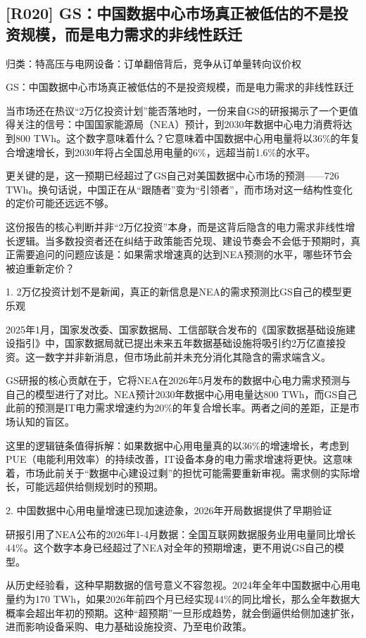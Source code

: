 \documentclass[11pt]{ctexart}
\begin{document}
\subsection{[R020] GS：中国数据中心市场真正被低估的不是投资规模，而是电力需求的非线性跃迁}
{\small\color{refgray}归类：特高压与电网设备：订单翻倍背后，竞争从订单量转向议价权}

GS：中国数据中心市场真正被低估的不是投资规模，而是电力需求的非线性跃迁

当市场还在热议“2万亿投资计划”能否落地时，一份来自GS的研报揭示了一个更值得关注的信号：中国国家能源局（NEA）预计，到2030年数据中心电力消费将达到800 TWh。这个数字意味着什么？它意味着中国数据中心用电量将以36\%的年复合增速增长，到2030年将占全国总用电量的6\%，远超当前1.6\%的水平。

更关键的是，这一预期已经超过了GS自己对美国数据中心市场的预测——726 TWh。换句话说，中国正在从“跟随者”变为“引领者”，而市场对这一结构性变化的定价可能还远远不够。

这份报告的核心判断并非“2万亿投资”本身，而是这背后隐含的电力需求非线性增长逻辑。当多数投资者还在纠结于政策能否兑现、建设节奏会不会低于预期时，真正需要追问的问题应该是：如果需求增速真的达到NEA预测的水平，哪些环节会被迫重新定价？

1. 2万亿投资计划不是新闻，真正的新信息是NEA的需求预测比GS自己的模型更乐观

2025年1月，国家发改委、国家数据局、工信部联合发布的《国家数据基础设施建设指引》中，国家数据局就已提出未来五年数据基础设施将吸引约2万亿直接投资。这一数字并非新消息，但市场此前并未充分消化其隐含的需求端含义。

GS研报的核心贡献在于，它将NEA在2026年5月发布的数据中心电力需求预测与自己的模型进行了对比。NEA预计2030年数据中心用电量达800 TWh，而GS自己此前的预测是IT电力需求增速约为20\%的年复合增长率。两者之间的差距，正是市场认知的盲区。

这里的逻辑链条值得拆解：如果数据中心用电量真的以36\%的增速增长，考虑到PUE（电能利用效率）的持续改善，IT设备本身的电力需求增速将更快。这意味着，市场此前关于“数据中心建设过剩”的担忧可能需要重新审视。需求侧的实际增长，可能远超供给侧规划时的预期。

2. 中国数据中心用电量增速已现加速迹象，2026年开局数据提供了早期验证

研报引用了NEA公布的2026年1-4月数据：全国互联网数据服务业用电量同比增长44\%。这个数字本身已经超过了NEA对全年的预期增速，更不用说GS自己的模型。

从历史经验看，这种早期数据的信号意义不容忽视。2024年全年中国数据中心用电量约为170 TWh，如果2026年前四个月已经实现44\%的同比增长，那么全年数据大概率会超出年初的预期。这种“超预期”一旦形成趋势，就会倒逼供给侧加速扩张，进而影响设备采购、电力基础设施投资、乃至电价政策。
\end{document}
